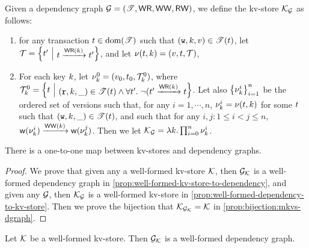 \begin{definition}
\label{def:dependency-to-kv-store}
Given a dependency graph $\mathcal{G} = (\mathscr{T}, \mathsf{WR}, \mathsf{WW}, \mathsf{RW})$, we define the kv-store $\mathcal{K}_{\mathcal{G}}$ as follows: 
\begin{enumerate}
\item for any transaction $t \in \operatorname{dom}(\mathscr{T})$ such that $(\textnormal{\texttt w}, k, v) \in \mathscr{T}(t)$, 
    let $\T = \Setcon{ \txid' }{ \txid \toEDGE{\WR(\key)} \txid'}$, and let $\nu(t, k) = (v, t, \mathcal{T})$, 
\item For each key $k$, let $\nu_{k}^{0} = (v_0, t_0, \mathcal{T}_k^{0})$, where $\T_{k}^{0} = \Setcon{ \txid }{ (\otR, \key, \_) \in 
\TtoOp{T}(\txid) \wedge \forall \txid'.\; \neg( \txid' \toEDGE{\WR(\key)} \txid }$. 
Let also  $\Set{ \ver_{\key}^{i} }_{i = 1}^{n}$ be the ordered set of versions such that, for any 
$i=1,\cdots,n$, $\nu_{k}^{i} = \nu(t, k)$ for some $t$ such that $(\textnormal{\texttt w}, k, \_) \in \mathscr{T}(t)$, 
and such that for any $i, j: 1 \leq i < j \leq n$, $\wtOf(\ver_{\key}^{i}) \toEDGE{\WW(\key)} \wtOf(\ver_{\key}^{j})$. 
Then we let $\mathcal{K}_{\mathcal{G}}= \lambda k. \prod_{i=0}^{n} \nu_{k}^{i}$.
\end{enumerate}
\end{definition}

\begin{theorem}
\label{thm:kv2graph}
There is a one-to-one map between kv-stores and dependency graphs.
\end{theorem}
\begin{proof}
    We prove that given any a well-formed kv-store \( \mathcal{K} \), then $\mathcal{G}_{\mathcal{K}}$ is a well-formed dependency graph in \cref{prop:well-formed-kv-store-to-dependency},
    and given any \( \mathcal{G} \), then  $\mathcal{K}_{\mathcal{G}}$ is a well-formed kv-store in \cref{prop:well-formed-dependency-to-kv-store}.
    Then we prove the bijection that $\mathcal{K}_{\mathcal{G}_{\mathcal{K}}} = \mathcal{K}$ in \cref{prop:bijection:mkvs-dgraph}.
\end{proof}



\begin{proposition}
\label{prop:well-formed-kv-store-to-dependency}
Let $\mathcal{K}$ be a well-formed kv-store. Then $\mathcal{G}_{\mathcal{K}}$ is a well-formed dependency graph.
\end{proposition}


